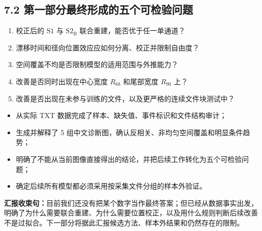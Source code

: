 \documentclass[UTF8,11pt,a4paper,oneside,fontset=none]{ctexart}
\newcommand{\Sone}{\mathrm{S1}}
\newcommand{\StwoB}{\mathrm{S2}_{\mathrm{B}}}
\newcommand{\Rsixtyeight}{R_{68}}
\newcommand{\Rninety}{R_{90}}
\begin{document}
\subsection*{7.2 第一部分最终形成的五个可检验问题}

\begin{enumerate}[label=\textbf{Q\arabic*.}]
  \item 校正后的 \(\Sone\) 与 \(\StwoB\) 联合重建，能否优于任一单通道？
  \item 漂移时间和径向位置效应应如何分离、校正并限制自由度？
  \item 空间覆盖不均是否限制模型的适用范围与外推能力？
  \item 改善是否同时出现在中心宽度 \(\Rsixtyeight\) 和尾部宽度 \(\Rninety\) 上？
  \item 改善是否出现在未参与训练的文件，以及更严格的连续文件块测试中？
\end{enumerate}

\begin{keybox}[title={第一部分已经完成了什么？},fonttitle=\bfseries]
\begin{itemize}
  \item 从实际 TXT 数据完成了样本、缺失值、事件标识和文件结构审计；
  \item 生成并解释了 5 组中文诊断图，确认反相关、非均匀空间覆盖和明显条件趋势；
  \item 明确了不能从当前图像直接得出的结论，并把后续工作转化为五个可检验问题；
  \item 确定后续所有模型都必须采用按采集文件分组的样本外验证。
\end{itemize}
\end{keybox}

\begin{conclusionbox}
\textbf{汇报收束句：}目前我们还没有把某个数字当作最终答案；但已经从数据事实出发，明确了为什么需要联合重建、为什么需要位置校正，以及用什么规则判断后续改善不是过拟合。下一部分将据此汇报候选方法、样本外结果和仍然存在的限制。
\end{conclusionbox}
\end{document}
